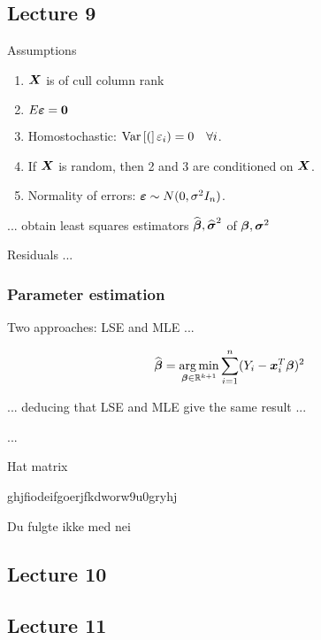


\subsection*{Lecture 9}

Assumptions
\begin{enumerate}
    \item $\boldsymbol{X}$ is of cull column rank
    \item $E\boldsymbol{\varepsilon}=\boldsymbol{0}$
    \item Homostochastic: $\mathrm{Var}\left[(\right]\varepsilon_i) = 0 \quad\forall i$.
    \item If $\boldsymbol{X}$ is random, then 2 and 3 are conditioned on $\boldsymbol{X}$. 
    \item Normality of errors: $\boldsymbol{\varepsilon}\sim N(0, \sigma^2I_n)$.
\end{enumerate}

... obtain least squares estimators $\widehat{\boldsymbol{\beta}}, \widehat{\boldsymbol{\sigma}}^2$ of $\boldsymbol{\beta}, \boldsymbol{\sigma}^2$

Residuals ...

\subsubsection*{Parameter estimation}

Two approaches: LSE and MLE ...

$$
    \widehat{\boldsymbol{\beta}} = \operatorname*{arg\,min}_{\boldsymbol{\beta}\in\mathbb{R}^{k+1}} \sum_{i=1}^n (Y_i - \boldsymbol{x}_i^T\boldsymbol{\beta})^2
$$

... deducing that LSE and MLE give the same result ...

...

Hat matrix

ghjfiodeifgoerjfkdworw9u0gryhj

Du fulgte ikke med nei

\subsection*{Lecture 10}



\subsection*{Lecture 11}

\begin{figure}[H] \centering
\end{figure}




